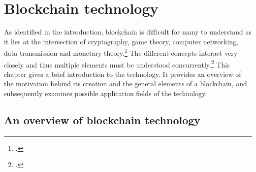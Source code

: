 \chapter{Blockchain technology} \label{chap:Blockchain}

As identified in the introduction, blockchain is difficult for many to understand as it lies at the intersection of cryptography, game theory, computer networking, data transmission and monetary theory.\footcite[Cf.][]{LoppNobodyUnderstandsBitcoin2017} The different concepts interact very closely and thus multiple elements must be understood concurrently.\footcite[Cf.][p.2]{SwellerVisualisationInstructionalDesign2002} This chapter gives a  brief introduction to the technology. It provides an overview of the motivation behind its creation and the general elements of a blockchain, and subsequently examines possible application fields of the technology. 

\section{An overview of blockchain technology} \label{sec:Blockchain}

